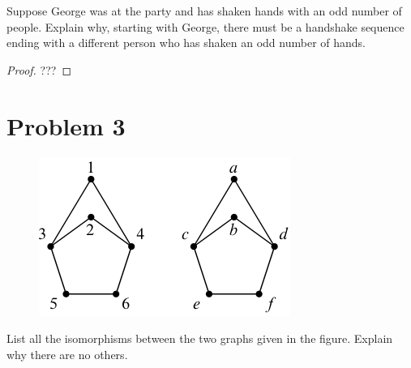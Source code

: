 \documentclass[14pt]{extarticle}
\begin{document}
Suppose George was at the party and has shaken hands with an odd number of people. Explain why, starting with George, there must be a handshake sequence ending with a different person who has shaken an odd number of hands.
\begin{proof}
???
\end{proof}

\section{Problem 3}
\begin{figure}[ht!]
\centering
\includegraphics[scale=0.75]{isom.png}
\end{figure}

List all the isomorphisms between the two graphs given in the figure. Explain why there are no others.
\end{document}
